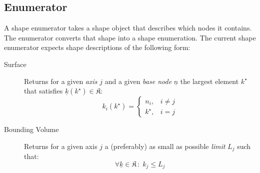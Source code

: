 \documentclass{article}
\begin{document}
\subsection{Enumerator}
A shape enumerator takes a shape object that describes which nodes it contains. The enumerator converts that shape into a shape enumeration. 
The current shape enumerator expects shape descriptions of the following form:
\begin{description}
\item [Surface] Returns for a given \emph{axis} \(j\) and a given \emph{base node} \( \underline{n} \) the largest element \( k^\star \) that satisfies \( \underline{k}(k^\star) \in \mathfrak{K} \): 
\[ k_i(k^\star) =
\begin{cases}
	n_i,& i \neq j\\
	k^\star, & i = j
	\end{cases}
\]
\item [Bounding Volume] Returns for a given axis \(j\) a (preferably) as small as possible \emph{limit} \( L_j \) such that:
\[ \forall \underline{k} \in \mathfrak{K} \,\colon\; k_j \leq L_j \]
\end{description}

\begin{figure}[!h]
\begin{floatrow}
\end{floatrow}
\end{figure}
\end{document}
